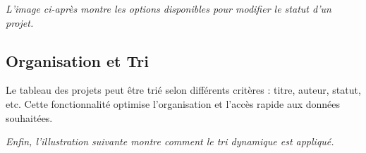 \documentclass[12pt]{article}
\begin{document}

\vspace{0.5cm}
\textit{L'image ci-après montre les options disponibles pour modifier le statut d’un projet.}
\vspace{0.5cm}

\subsection{Organisation et Tri}

Le tableau des projets peut être trié selon différents critères : titre, auteur, statut, etc. Cette fonctionnalité optimise l’organisation et l’accès rapide aux données souhaitées.


\vspace{0.5cm}
\textit{Enfin, l’illustration suivante montre comment le tri dynamique est appliqué.}
\vspace{0.5cm}
\end{document}
